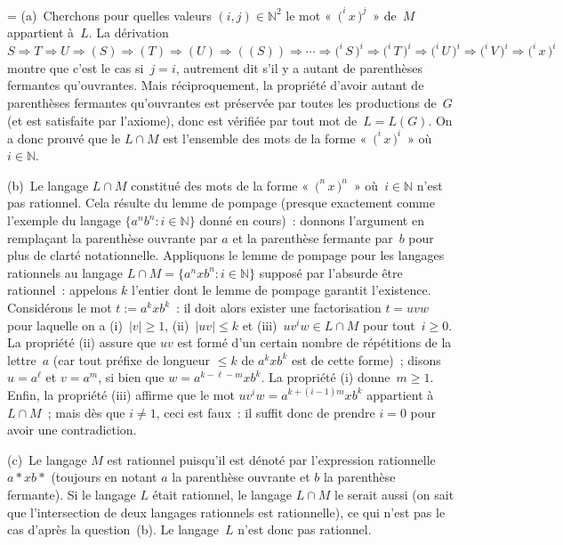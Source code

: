 \documentclass[12pt,a4paper]{article}
\theoremstyle{definition}
\newif\ifcorrige
\newenvironment{corrige}%
{\ifcorrige\relax\else\setbox0=\vbox\bgroup\fi%
\smallbreak\footnotesize\noindent{\underbar{\textit{Corrigé.}}\quad}}
{{\hbox{}\nobreak\hfill\checkmark}%
\ifcorrige\relax\else\egroup\fi\par}
\begin{document}
\begin{corrige}
(a) Cherchons pour quelles valeurs $(i,j) \in \mathbb{N}^2$ le mot
  « ${(}^i\, x\, {)}^j$ » de $M$ appartient à $L$.  La dérivation $S
  \Rightarrow T \Rightarrow U \Rightarrow (S) \Rightarrow (T)
  \Rightarrow (U) \Rightarrow ((S)) \Rightarrow \cdots
  \Rightarrow{(}^i\, S\, {)}^i \Rightarrow{(}^i\, T\, {)}^i
  \Rightarrow{(}^i\, U\, {)}^i \Rightarrow{(}^i\, V\, {)}^i
  \Rightarrow{(}^i\, x\, {)}^i$ montre que c'est le cas si $j=i$,
  autrement dit s'il y a autant de parenthèses fermantes qu'ouvrantes.
  Mais réciproquement, la propriété d'avoir autant de parenthèses
  fermantes qu'ouvrantes est préservée par toutes les productions
  de $G$ (et est satisfaite par l'axiome), donc est vérifiée par tout
  mot de $L=L(G)$.  On a donc prouvé que le $L\cap M$ est l'ensemble
  des mots de la forme « ${(}^i\, x\, {)}^i$ » où $i\in \mathbb{N}$.

(b) Le langage $L\cap M$ constitué des mots de la forme « ${(}^n\,
  x\, {)}^n$ » où $i\in \mathbb{N}$ n'est pas rationnel.  Cela résulte
  du lemme de pompage (presque exactement comme l'exemple du langage
  $\{a^n b^n : i\in\mathbb{N}\}$ donné en cours) : donnons l'argument
  en remplaçant la parenthèse ouvrante par $a$ et la parenthèse
  fermante par $b$ pour plus de clarté notationnelle.  Appliquons le
  lemme de pompage pour les langages rationnels au langage $L \cap M =
  \{a^n x b^n : i\in\mathbb{N}\}$ supposé par l'absurde être
  rationnel : appelons $k$ l'entier dont le lemme de pompage garantit
  l'existence.  Considérons le mot $t := a^k x b^k$ : il doit alors
  exister une factorisation $t = uvw$ pour laquelle on a (i) $|v|\geq
  1$, (ii) $|uv|\leq k$ et (iii) $uv^iw \in L\cap M$ pour tout $i\geq
  0$.  La propriété (ii) assure que $uv$ est formé d'un certain nombre
  de répétitions de la lettre $a$ (car tout préfixe de longueur $\leq
  k$ de $a^k x b^k$ est de cette forme) ; disons $u = a^\ell$ et $v =
  a^m$, si bien que $w = a^{k-\ell-m} x b^k$.  La propriété (i)
  donne $m\geq 1$.  Enfin, la propriété (iii) affirme que le mot
  $uv^iw = a^{k+(i-1)m} x b^k$ appartient à $L\cap M$ ; mais dès que
  $i\neq 1$, ceci est faux : il suffit donc de prendre $i=0$ pour
  avoir une contradiction.

(c) Le langage $M$ est rationnel puisqu'il est dénoté par l'expression
  rationnelle $a{*}xb{*}$ (toujours en notant $a$ la parenthèse
  ouvrante et $b$ la parenthèse fermante).  Si le langage $L$ était
  rationnel, le langage $L\cap M$ le serait aussi (on sait que
  l'intersection de deux langages rationnels est rationnelle), ce qui
  n'est pas le cas d'après la question (b).  Le langage $L$ n'est donc
  pas rationnel.
\end{corrige}
\end{document}
